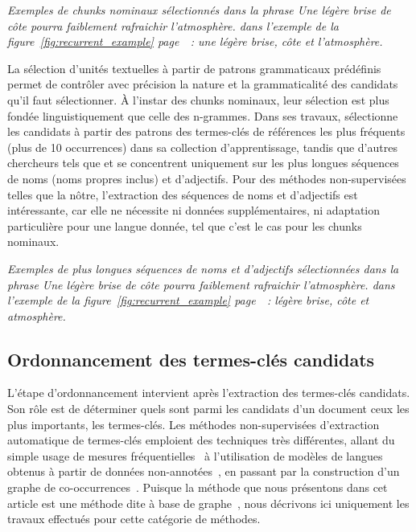     \textit{Exemples de chunks nominaux sélectionnés dans la phrase \og{}Une
    légère brise de côte pourra faiblement rafraichir l'atmosphère.\fg{} dans
    l'exemple de la figure~\ref{fig:recurrent_example}
    page~\pageref{fig:recurrent_example}~: \og{}une légère brise\fg{},
    \og{}côte\fg{} et \og{}l'atmosphère\fg{}.}

    La sélection d'unités textuelles à partir de patrons grammaticaux prédéfinis
    permet de contrôler avec précision la nature et la grammaticalité des
    candidats qu'il faut sélectionner. À l'instar des chunks nominaux, leur
    sélection est plus fondée linguistiquement que celle des n-grammes. Dans ses
    travaux,  sélectionne les candidats à
    partir des patrons des termes-clés de références les plus fréquents (plus de
    10 occurrences) dans sa collection d'apprentissage, tandis que d'autres
    chercheurs tels que  et
     se concentrent uniquement sur les plus
    longues séquences de noms (noms propres inclus) et d'adjectifs. Pour des
    méthodes non-supervisées telles que la nôtre, l'extraction des séquences de
    noms et d'adjectifs est intéressante, car elle ne nécessite ni données
    supplémentaires, ni adaptation particulière pour une langue donnée, tel que
    c'est le cas pour les chunks nominaux.

    \textit{Exemples de plus longues séquences de noms et d'adjectifs
    sélectionnées dans la phrase \og{}Une légère brise de côte pourra faiblement
    rafraichir l'atmosphère.\fg{} dans l'exemple de la
    figure~\ref{fig:recurrent_example} page~\pageref{fig:recurrent_example}~:
    \og{}légère brise\fg{}, \og{}côte\fg{} et \og{}atmosphère\fg{}.}

  \subsection{Ordonnancement des termes-clés candidats}
  \label{subsec:ordonnancement_des_termes_cles_candidats}
    L'étape d'ordonnancement intervient après l'extraction des termes-clés
    candidats. Son rôle est de déterminer quels sont parmi les candidats d'un
    document ceux les plus importants, les termes-clés.
    Les méthodes non-supervisées d'extraction automatique de termes-clés
    emploient des techniques très différentes, allant du simple usage de mesures
    fréquentielles~\cite{paukkeri2010likey} à l'utilisation de modèles de
    langues obtenus à partir de données
    non-annotées~\cite{tomokiyo2003languagemodel}, en passant par la
    construction d'un graphe de co-occurrences~\cite{mihalcea2004textrank}.
    Puisque la méthode que nous présentons dans cet article est une méthode dite
    \og à base de graphe~\fg, nous décrivons ici uniquement les travaux
    effectués pour cette catégorie de méthodes.

